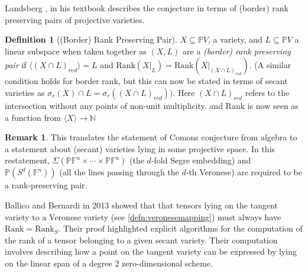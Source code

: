 \documentclass[12pt,a4paper,oneside]{book}
\def\naturals{\mathbb{N}} %
\def\proj{\mathbb{P}} %
\def\field{\mathbb{F}} %
\def\rank{\text{Rank}} %
\def\srank{\text{Rank}_S} %
\theoremstyle{definition}
\newtheorem{definition}{Definition}[section]
\newtheorem*{remark}{Remark}
\begin{document}
Landsberg \cite{landsberg_tensors_2012}, in his textbook describes the conjecture in terms of (border) rank preserving pairs of projective varieties. 
\begin{definition}[(Border) Rank Preserving Pair]\label{defn:brpp}
    $X \subseteq \proj V$, a variety, and $L \subseteq \proj V$ a linear subspace when taken together as $(X,L)$ are a \textit{(border) rank preserving pair} if $\langle(X \cap L)_{red}\rangle = L$ and $\rank(X|_L) = \rank(X|_{(X \cap L)_{red}})$. (A similar condition holds for border rank, but this can now be stated in terms of secant varieties as $\sigma_r(X) \cap L = \sigma_r((X\cap L)_{red}))$. Here $(X\cap L)_{red}$ refers to the intersection without any points of non-unit multiplicity. and $\rank$ is now seen as a function from $\langle X \rangle \to \naturals$
\end{definition}
\begin{remark}
    This translates the statement of Comons conjecture from algebra to a statement about (secant) varieties lying in some projective space. In this restatement, $\Sigma(\proj \field^n \times \cdots \times \proj \field^n)$ (the $d$-fold Segre embedding) and $\proj(S^d(\field^n))$ (all the lines passing through the $d$-th Veronese) are required to be a rank-preserving pair.
\end{remark}

Ballico and Bernardi \cite{ballico_tensor_2013} in 2013 showed that that tensors lying on the tangent variety to a Veronese variety (see \cref{defn:veronesemapping}) must always have $\rank = \srank$. Their proof highlighted explicit algorithms for the computation of the rank of a tensor belonging to a given secant variety. Their computation involves describing how a point on the tangent variety can be expressed by lying on the linear span of a degree 2 zero-dimensional scheme.


\end{document}
